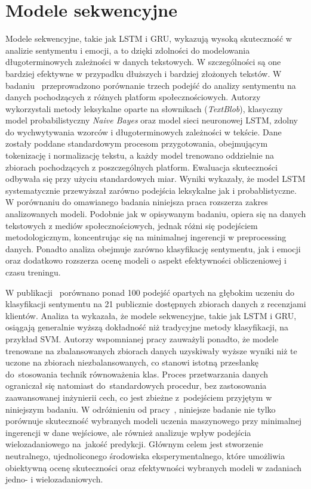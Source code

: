 \section{Modele sekwencyjne}
Modele sekwencyjne, takie jak LSTM i GRU, wykazują wysoką skuteczność w analizie sentymentu i emocji, a to dzięki zdolności do modelowania długoterminowych zależności w danych tekstowych. W szczególności są one bardziej efektywne w przypadku dłuższych i bardziej złożonych tekstów. W badaniu~\cite{SAKapur} przeprowadzono porównanie trzech podejść do analizy sentymentu na danych pochodzących z różnych platform społecznościowych. Autorzy wykorzystali metody leksykalne oparte na słownikach (\textit{TextBlob}), klasyczny model probabilistyczny \textit{Naive Bayes} oraz model sieci neuronowej LSTM, zdolny do wychwytywania wzorców i długoterminowych zależności w tekście. Dane zostały poddane standardowym procesom przygotowania, obejmującym tokenizację i normalizację tekstu, a każdy model trenowano oddzielnie na zbiorach pochodzących z poszczególnych platform. Ewaluacja skuteczności odbywała się przy użyciu standardowych miar. Wyniki wykazały, że model LSTM systematycznie przewyższał zarówno podejścia leksykalne jak i probablistyczne. W porównaniu do omawianego badania niniejsza praca rozszerza zakres analizowanych modeli. Podobnie jak w opisywanym badaniu, opiera się na danych tekstowych z mediów społecznościowych, jednak różni się podejściem metodologicznym, koncentrując się na minimalnej ingerencji w preprocessing danych. Ponadto analiza obejmuje zarówno klasyfikację sentymentu, jak i emocji oraz dodatkowo rozszerza ocenę modeli o aspekt efektywności obliczeniowej i czasu treningu.

W publikacji~\cite{SCMohamed} porównano ponad 100 podejść opartych na głębokim uczeniu do klasyfikacji sentymentu na 21 publicznie dostępnych zbiorach danych z recenzjami klientów. Analiza ta wykazała, że modele sekwencyjne, takie jak LSTM i GRU, osiągają generalnie wyższą dokładność niż tradycyjne metody klasyfikacji, na przykład SVM. Autorzy wspomnianej pracy zauważyli ponadto, że modele trenowane na zbalansowanych zbiorach danych uzyskiwały wyższe wyniki niż te uczone na zbiorach niezbalansowanych, co stanowi istotną przesłankę do~stosowania technik równoważenia klas. Proces przetwarzania danych ograniczał się natomiast do~standardowych procedur, bez zastosowania zaawansowanej inżynierii cech, co jest zbieżne z~podejściem przyjętym w niniejszym badaniu. W odróżnieniu od pracy~\cite{SCMohamed}, niniejsze badanie nie tylko porównuje skuteczność wybranych modeli uczenia maszynowego przy minimalnej ingerencji w dane wejściowe, ale również analizuje wpływ podejścia wielozadaniowego na~jakość predykcji. Głównym celem jest stworzenie neutralnego, ujednoliconego środowiska eksperymentalnego, które umożliwia obiektywną ocenę skuteczności oraz efektywności wybranych modeli w zadaniach jedno- i wielozadaniowych.

